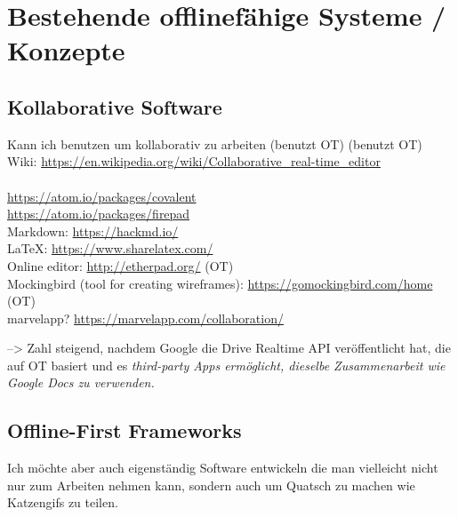 \chapter{\label{chap:state}Bestehende offlinefähige Systeme / Konzepte}
\section{Kollaborative Software}
Kann ich benutzen um kollaborativ zu arbeiten
(benutzt OT)
(benutzt OT)
Wiki: \url{https://en.wikipedia.org/wiki/Collaborative_real-time_editor}\\\\
\url{https://atom.io/packages/covalent}\\
\url{https://atom.io/packages/firepad}\\
Markdown: \url{https://hackmd.io/}\\
LaTeX: \url{https://www.sharelatex.com/}\\
Online editor: \url{http://etherpad.org/} (OT)\\
Mockingbird (tool for creating wireframes): \url{https://gomockingbird.com/home} (OT)\\
marvelapp? \url{https://marvelapp.com/collaboration/}

--> Zahl steigend, nachdem Google die Drive Realtime API veröffentlicht hat, die auf \gls{OT} basiert und es \it{third-party Apps} ermöglicht, dieselbe Zusammenarbeit wie Google Docs zu verwenden.
\section{Offline-First Frameworks}
Ich möchte aber auch eigenständig Software entwickeln die man vielleicht nicht nur zum Arbeiten nehmen kann, sondern auch um Quatsch zu machen wie Katzengifs zu teilen.
\cite{realm}
\cite{hoodie}